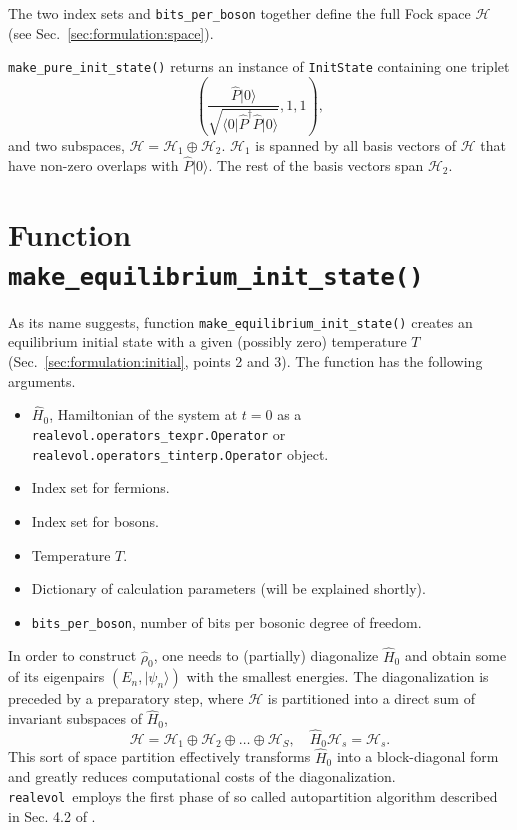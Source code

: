 \documentclass[]{article}
\newcommand{\realevol}{\texttt{realevol}}
\newcommand{\bra}[1]{\ensuremath{\langle#1|}}
\newcommand{\ket}[1]{\ensuremath{|#1\rangle}}
\begin{document}
The two index sets and \texttt{bits\_per\_boson} together define the full Fock
space $\mathcal{H}$ (see Sec.~\ref{sec:formulation:space}).

\texttt{make\_pure\_init\_state()} returns an instance of \texttt{InitState}
containing one triplet
\begin{equation}
    \left(
        \frac{\hat P\ket{0}}{\sqrt{\bra{0}\hat P^\dagger \hat P\ket{0}}},
        1,
        1
    \right),
\end{equation}
and two subspaces, $\mathcal{H}=\mathcal{H}_1\oplus\mathcal{H}_2$.
$\mathcal{H}_1$ is spanned by all basis vectors of $\mathcal{H}$ that have non-zero overlaps with $\hat P\ket{0}$. The rest of the basis vectors span
$\mathcal{H}_2$.

\section{\label{sec:make_equilibrium_init_state}Function \texttt{make\_equilibrium\_init\_state()}}

As its name suggests, function \texttt{make\_equilibrium\_init\_state()} creates
an equilibrium initial state with a given (possibly zero) temperature $T$ (Sec.~\ref{sec:formulation:initial}, points 2 and 3). The function has the following arguments.
\begin{itemize}
    \item $\hat H_0$, Hamiltonian of the system at $t=0$ as a
    \texttt{realevol.operators\_texpr.Operator} or\\
    \texttt{realevol.operators\_tinterp.Operator} object.
    \item Index set for fermions.
    \item Index set for bosons.
    \item Temperature $T$.
    \item Dictionary of calculation parameters (will be explained shortly).
    \item \texttt{bits\_per\_boson}, number of bits per bosonic
    degree of freedom.
\end{itemize}

In order to construct $\hat\rho_0$, one needs to (partially) diagonalize $\hat H_0$ and obtain some of its eigenpairs $(E_n,\ket{\psi_n})$ with the smallest energies. The diagonalization is preceded by a preparatory step, where $\mathcal{H}$
is partitioned into a direct sum of invariant subspaces of $\hat H_0$,
\begin{equation}
    \mathcal{H} = \mathcal{H}_1 \oplus \mathcal{H}_2 \oplus \ldots \oplus
        \mathcal{H}_S,\quad \hat H_0\mathcal{H}_s = \mathcal{H}_s.
\end{equation}
This sort of space partition effectively transforms $\hat H_0$ into a block-diagonal form and greatly reduces computational costs of the diagonalization. \realevol~employs the first phase of so called autopartition
algorithm described in Sec. 4.2 of \cite{CTHYB}.
\end{document}
